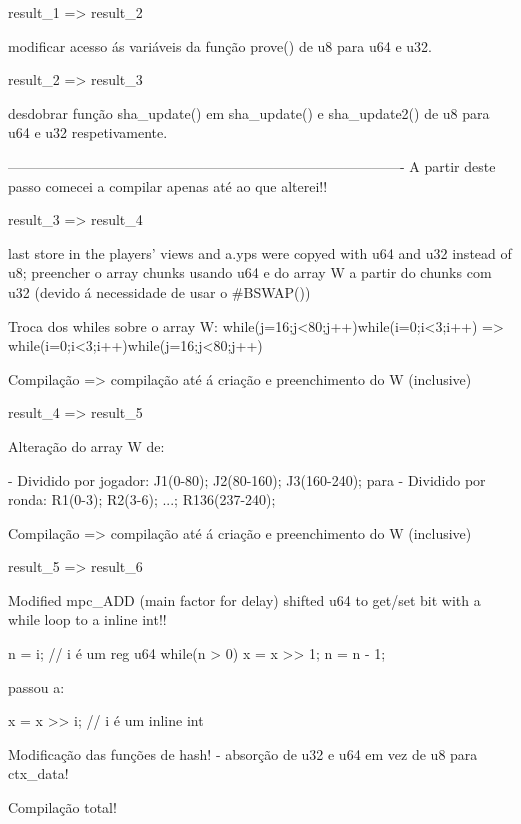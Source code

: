 result_1 => result_2

modificar acesso ás variáveis da função prove() de u8 para u64 e u32.


result_2 => result_3

desdobrar função sha_update() em sha_update() e sha_update2() de u8 para u64 e u32 respetivamente.


-------------------------------------------------------------------------------------
A partir deste passo comecei a compilar apenas até ao que alterei!!

result_3 => result_4

last store in the players' views and a.yps were copyed with u64 and u32 instead of u8;
preencher o array chunks usando u64 e  do array W a partir do chunks com u32 (devido á necessidade de usar o #BSWAP())

Troca dos whiles sobre o array W: 
while(j=16;j<80;j++){while(i=0;i<3;i++){}} => while(i=0;i<3;i++){while(j=16;j<80;j++){}}


Compilação => compilação até á criação e preenchimento do W (inclusive)

result_4 => result_5

Alteração do array W de:
	
	- Dividido por jogador: J1(0-80); J2(80-160); J3(160-240);
	 para
	- Dividido por ronda: R1(0-3); R2(3-6); ...; R136(237-240);


Compilação => compilação até á criação e preenchimento do W (inclusive)


result_5 => result_6



Modified mpc_ADD (main factor for delay) shifted u64 to get/set bit with a while loop to a inline int!!

	n = i;		     // i é um reg u64
	while(n > 0){
		x = x >> 1;
		n = n - 1;
	}

	passou a:

	x = x >> i;     // i é um inline int

Modificação das funções de hash! - absorção de u32 e u64  em vez de u8 para ctx_data!


Compilação total!




